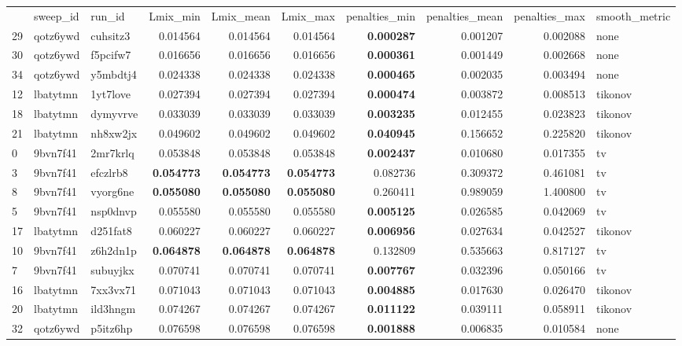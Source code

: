 \documentclass[nomenclature, english, bibtex]{kththesis}
\numberwithin{listing}{chapter}
\begin{document}
\begin{tabular}{lllrrrrrrl}
 & sweep_id & run_id & Lmix_min & Lmix_mean & Lmix_max & penalties_min & penalties_mean & penalties_max & smooth_metric \\
29 & qotz6ywd & cuhsitz3 & 0.014564 & 0.014564 & 0.014564 & \bfseries 0.000287 & 0.001207 & 0.002088 & none \\
30 & qotz6ywd & f5pcifw7 & 0.016656 & 0.016656 & 0.016656 & \bfseries 0.000361 & 0.001449 & 0.002668 & none \\
34 & qotz6ywd & y5mbdtj4 & 0.024338 & 0.024338 & 0.024338 & \bfseries 0.000465 & 0.002035 & 0.003494 & none \\
12 & lbatytmn & 1yt7love & 0.027394 & 0.027394 & 0.027394 & \bfseries 0.000474 & 0.003872 & 0.008513 & tikonov \\
18 & lbatytmn & dymyvrve & 0.033039 & 0.033039 & 0.033039 & \bfseries 0.003235 & 0.012455 & 0.023823 & tikonov \\
21 & lbatytmn & nh8xw2jx & 0.049602 & 0.049602 & 0.049602 & \bfseries 0.040945 & 0.156652 & 0.225820 & tikonov \\
0 & 9bvn7f41 & 2mr7krlq & 0.053848 & 0.053848 & 0.053848 & \bfseries 0.002437 & 0.010680 & 0.017355 & tv \\
3 & 9bvn7f41 & efczlrb8 & \bfseries 0.054773 & \bfseries 0.054773 & \bfseries 0.054773 & 0.082736 & 0.309372 & 0.461081 & tv \\
8 & 9bvn7f41 & vyorg6ne & \bfseries 0.055080 & \bfseries 0.055080 & \bfseries 0.055080 & 0.260411 & 0.989059 & 1.400800 & tv \\
5 & 9bvn7f41 & nsp0dnvp & 0.055580 & 0.055580 & 0.055580 & \bfseries 0.005125 & 0.026585 & 0.042069 & tv \\
17 & lbatytmn & d251fat8 & 0.060227 & 0.060227 & 0.060227 & \bfseries 0.006956 & 0.027634 & 0.042527 & tikonov \\
10 & 9bvn7f41 & z6h2dn1p & \bfseries 0.064878 & \bfseries 0.064878 & \bfseries 0.064878 & 0.132809 & 0.535663 & 0.817127 & tv \\
7 & 9bvn7f41 & subuyjkx & 0.070741 & 0.070741 & 0.070741 & \bfseries 0.007767 & 0.032396 & 0.050166 & tv \\
16 & lbatytmn & 7xx3vx71 & 0.071043 & 0.071043 & 0.071043 & \bfseries 0.004885 & 0.017630 & 0.026470 & tikonov \\
20 & lbatytmn & ild3hngm & 0.074267 & 0.074267 & 0.074267 & \bfseries 0.011122 & 0.039111 & 0.058911 & tikonov \\
32 & qotz6ywd & p5itz6hp & 0.076598 & 0.076598 & 0.076598 & \bfseries 0.001888 & 0.006835 & 0.010584 & none \\

\end{tabular}
\end{document}
